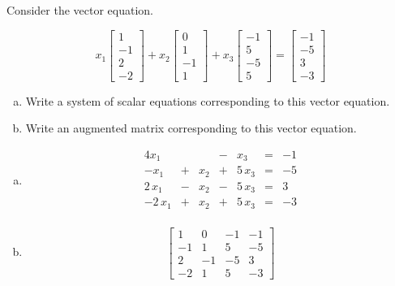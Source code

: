 
\begin{exerciseStatement}


Consider the vector equation.

\[ x_{1} \left[\begin{array}{c}
1 \\
-1 \\
2 \\
-2
\end{array}\right] + x_{2} \left[\begin{array}{c}
0 \\
1 \\
-1 \\
1
\end{array}\right] + x_{3} \left[\begin{array}{c}
-1 \\
5 \\
-5 \\
5
\end{array}\right] = \left[\begin{array}{c}
-1 \\
-5 \\
3 \\
-3
\end{array}\right] \]
\begin{enumerate}[(a)]
\item  Write a system of scalar equations corresponding to this vector equation. 
\item  Write an augmented matrix corresponding to this vector equation. 
\end{enumerate}
    
\end{exerciseStatement}
    
\begin{exerciseAnswer} 

\begin{enumerate}[(a)]
\item 
\begin{alignat*}{4} x_{1} & &  &-& x_{3} &=& -1 \\-x_{1} &+& x_{2} &+& 5 \, x_{3} &=& -5 \\2 \, x_{1} &-& x_{2} &-& 5 \, x_{3} &=& 3 \\-2 \, x_{1} &+& x_{2} &+& 5 \, x_{3} &=& -3 \\ \end{alignat*}
            
\item \[ \left[\begin{array}{ccc|c}
1 & 0 & -1 & -1 \\
-1 & 1 & 5 & -5 \\
2 & -1 & -5 & 3 \\
-2 & 1 & 5 & -3
\end{array}\right] \]
\end{enumerate}
    
\end{exerciseAnswer}
    
